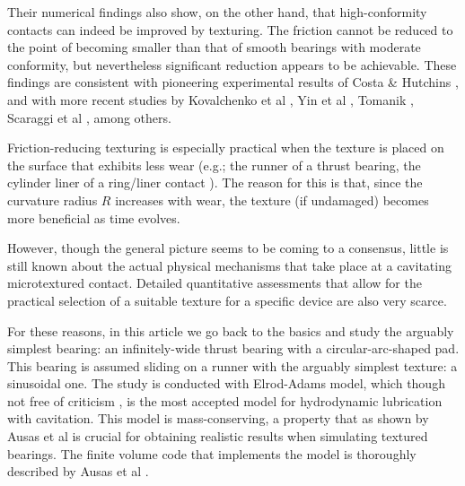 Their numerical findings also show, on the other hand, that high-conformity
contacts can indeed be improved by texturing. The friction cannot
be reduced to the point of becoming smaller than that of
smooth bearings with moderate conformity, but nevertheless
significant reduction appears to be achievable. These findings
are consistent with pioneering experimental results of Costa \& Hutchins \cite{costa2007}, and with more recent studies by Kovalchenko et al \cite{koval2011},
Yin et al \cite{yin2012}, Tomanik \cite{tomanik2013}, Scaraggi et al 
\cite{scaraggi2013}, among others\cite{qiu11,grabon2013,cross2013,zhang2012}.

Friction-reducing texturing is especially
practical when the texture is placed on the surface that
exhibits less wear (e.g.; the runner of a thrust bearing, the
cylinder liner of a ring/liner contact \cite{tomanik2013}). The reason for this is
that, since the curvature
radius $R$ increases with wear, the texture (if undamaged)
becomes more beneficial as time evolves.

However, though the general picture seems to be coming to
a consensus, little is still known about the actual physical
mechanisms that take place at a cavitating microtextured
contact. Detailed quantitative assessments that allow for
the practical selection of a suitable texture for a
specific device are also very scarce.

For these reasons, in this article we go back to the basics and
study the arguably simplest bearing: an infinitely-wide
thrust bearing with a circular-arc-shaped pad. This bearing
is assumed sliding on
a runner with the arguably simplest texture: a sinusoidal one.
The study is conducted with Elrod-Adams model, which though
not free of criticism \cite{ausas2013, buscaglia2013},
is the most accepted model for hydrodynamic lubrication with
cavitation. This model is mass-conserving, a property that as shown
by Ausas et al \cite{ausas07} is crucial for obtaining realistic
results when simulating textured bearings. The finite volume
code that implements the model is thoroughly described by
Ausas et al \cite{ausas09}.

